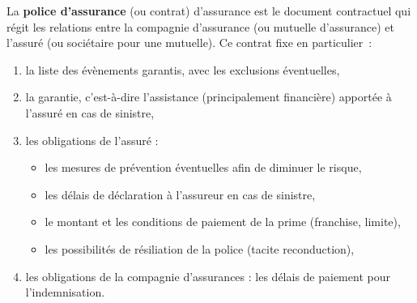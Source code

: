 \begin{f}
	
	La \textbf{police d'assurance} (ou contrat) d'assurance est le document contractuel qui régit les relations entre la compagnie d'assurance (ou mutuelle d'assurance) et l'assuré (ou sociétaire pour une mutuelle). 
	Ce contrat fixe en particulier~:
	
	\begin{enumerate}
		\item  la liste des évènements garantis, avec les exclusions éventuelles,
		\item  la garantie, c'est-à-dire l'assistance (principalement financière) apportée à l'assuré en cas de sinistre,
		\item  les obligations de l'assuré :
		\begin{itemize}
			\item les mesures de prévention éventuelles afin de diminuer le risque,
			\item les délais de déclaration à l'assureur en cas de sinistre,
			\item le montant et les conditions de paiement de la prime (franchise, limite),
			\item les possibilités de résiliation de la police (tacite reconduction),
		\end{itemize}
		\item  les obligations de la compagnie d'assurances : les délais de paiement pour l'indemnisation.
		
	\end{enumerate}
	
\end{f}
